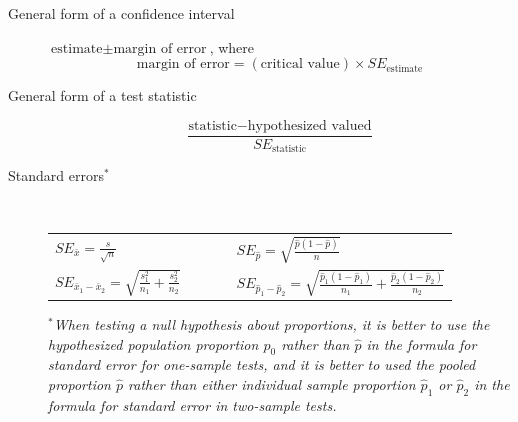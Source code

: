 \documentclass[11pt]{exam}
\newcommand{\ds}{\displaystyle}
\begin{document}
\begin{description}
%
%


\item[General form of a confidence interval] $\text{estimate} \pm \text{margin of error}$, where
$$\text{margin of error} = (\text{critical value}) \times SE_{\text{estimate}}$$
\vfill

\item[General form of a test statistic]
$$ \frac{\text{statistic} - \text{hypothesized valued}}{SE_{\text{statistic}}}$$
\vfill

\item[Standard errors$^*$] ~
\begin{center}
\begin{tabular}{lcl} 
$\ds SE_{\bar{x}} = \frac{s}{\sqrt{n}}$ & ~~~~ & $\ds SE_{\hat{p}} = \sqrt{\frac{\hat{p}(1-\hat{p})}{n}}$ \\
$\ds SE_{\bar{x}_1 - \bar{x}_2} = \sqrt{\frac{s_1^2}{n_1}+\frac{s_2^2}{n_2}}$ &  & $\ds SE_{\hat{p}_1-\hat{p}_2} = \sqrt{\frac{\hat{p}_1(1-\hat{p}_1)}{n_1}+\frac{\hat{p}_2(1-\hat{p}_2)}{n_2}}$ \\
\end{tabular}
\end{center}
$^*$\textit{When testing a null hypothesis about proportions, it is better to use the hypothesized population proportion $p_0$ rather than $\hat{p}$ in the formula for standard error for one-sample tests, and it is better to used the pooled proportion $\hat{p}$ rather than either individual sample proportion $\hat{p}_1$ or $\hat{p}_2$ in the formula for standard error in two-sample tests. }
\vfill



\end{description}
\end{document}
